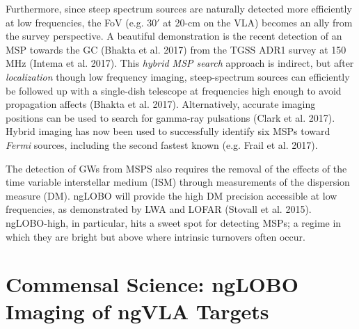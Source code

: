 \documentclass[11pt]{article}
\begin{document}
Furthermore, since steep spectrum sources are naturally detected more efficiently at low frequencies, the FoV (e.g. $30'$ at 20-cm on the VLA) becomes an ally from the survey perspective. A beautiful demonstration is the recent detection of an MSP towards the GC (Bhakta et al. 2017) from the TGSS ADR1 survey at 150 MHz (Intema et al. 2017). This {\it hybrid MSP search} approach is indirect, but after {\it localization} though low frequency imaging, steep-spectrum sources can efficiently be followed up with a single-dish telescope at frequencies high enough to avoid propagation affects (Bhakta et al. 2017). Alternatively, accurate imaging positions can be used to search for gamma-ray pulsations (Clark et al. 2017). Hybrid imaging has now been used to successfully identify six MSPs toward  \emph{Fermi} sources, including the second fastest known (e.g. Frail et al. 2017).  

The detection of GWs from MSPS also requires the
removal of the effects of the time variable interstellar medium (ISM) through measurements of the dispersion measure (DM). ngLOBO will provide the high DM precision accessible at low frequencies, as demonstrated by LWA and LOFAR (Stovall et al. 2015).  ngLOBO-high, in particular, hits a sweet spot for detecting MSPs; a regime in which they are bright but above where intrinsic turnovers often occur.  








\vspace{-0.5cm}
\section{Commensal Science: ngLOBO Imaging of ngVLA Targets}
\vspace{-0.25cm}
\end{document}
